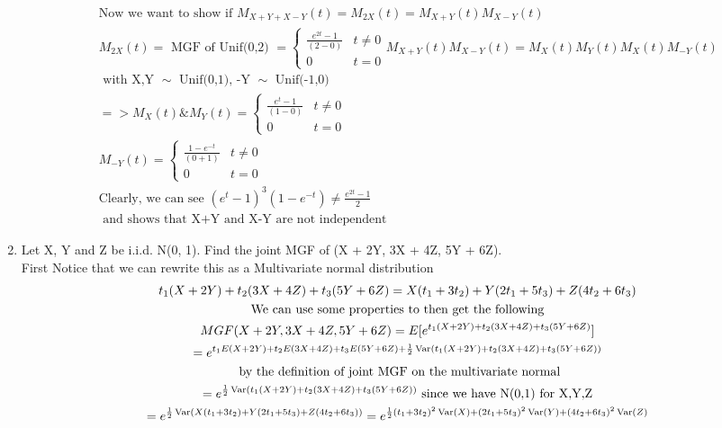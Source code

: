 \documentclass[11pt]{article}
\newcommand{\Var}{\mathop{\rm Var}}
\begin{document}
\begin{enumerate}
\begin{enumerate}
\begin{gather}
		\text{Now we want to show if } M_{X+Y+X-Y}(t)=M_{2X}(t) = M_{X+Y}(t)M_{X-Y}(t)\\
		M_{2X}(t) = \text{ MGF of Unif(0,2) } = 
		\begin{cases}
		\frac{e^{2t}-1}{(2-0)} & t \ne 0\\
			0 & t=0
		\end{cases}
		M_{X+Y}(t)M_{X-Y}(t)=M_X(t)M_Y(t)M_X(t)M_{-Y}(t)\\
		 \text{ with X,Y $\sim$ Unif(0,1), -Y $\sim$ Unif(-1,0)}\\
		 => M_X(t) \& M_Y(t) = 
		 \begin{cases}
		 \frac{e^{t}-1}{(1-0)} & t \ne 0\\
		 0 & t=0
		 \end{cases}\\
		 M_{-Y}(t) = 
		 \begin{cases}
		 \frac{1-e^{-t}}{(0+1)} & t \ne 0\\
		 0 & t=0
		 \end{cases}\\
		 \text{Clearly, we can see } (e^{t}-1)^3(1-e^{-t}) \ne \frac{e^{2t}-1}{2}\\
		 \text{ and shows that X+Y and X-Y are not independent}
	\end{gather}
\end{enumerate}
\item Let X, Y and Z be i.i.d. N(0, 1). Find the joint MGF of (X + 2Y, 3X + 4Z, 5Y + 6Z).\\
First Notice that we can rewrite this as a Multivariate normal distribution
\begin{gather}
	t_1(X+2Y)+t_2(3X + 4Z)+t_3(5Y + 6Z) = X(t_1+3t_2) + Y(2t_1+5t_3) + Z(4t_2+6t_3)\\
	\text{We can use some properties to then get the following}\\
	MGF(X + 2Y, 3X + 4Z, 5Y + 6Z) = E[e^{t_1(X + 2Y) + t_2(3X + 4Z) + t_3(5Y+6Z)}] \\
	= e^{t_1E(X + 2Y) + t_2E(3X + 4Z) + t_3E(5Y+6Z) + \frac{1}{2} \Var(t_1(X + 2Y) + t_2(3X + 4Z) + t_3(5Y+6Z))} \\
	\text{ by the definition of joint MGF on the multivariate normal}\\
	= e^{\frac{1}{2} \Var(t_1(X + 2Y) + t_2(3X + 4Z) + t_3(5Y+6Z))} \text{ since we have N(0,1) for X,Y,Z}\\
	=e^{\frac{1}{2} \Var(X(t_1+3t_2) + Y(2t_1+5t_3) + Z(4t_2+6t_3))}
	=e^{\frac{1}{2} (t_1+3t_2)^2\Var(X)+(2t_1+5t_3)^2\Var(Y) + (4t_2+6t_3)^2\Var(Z)}\\

\end{gather}
\end{enumerate}
\end{document}
